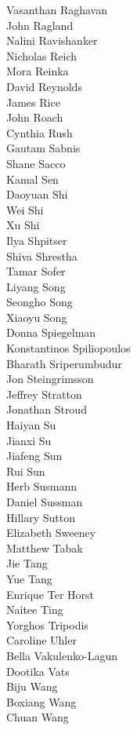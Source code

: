 Vasanthan Raghavan\\
John Ragland\\
Nalini Ravishanker\\
Nicholas Reich\\
Mora Reinka\\
David Reynolds\\
James Rice\\
John Roach\\
Cynthia Rush\\
Gautam Sabnis\\
Shane Sacco\\
Kamal Sen\\
Daoyuan Shi\\
Wei Shi\\
Xu Shi\\
Ilya Shpitser\\
Shiva Shrestha\\
Tamar Sofer\\
Liyang Song\\
Seongho Song\\
Xiaoyu Song\\
Donna Spiegelman\\
Konstantinos Spiliopoulos\\
Bharath Sriperumbudur\\
Jon Steingrimsson\\
Jeffrey Stratton\\
Jonathan Stroud\\
Haiyan Su\\
Jianxi Su\\
Jiafeng Sun\\
Rui Sun\\
Herb Susmann\\
Daniel Sussman\\
Hillary Sutton\\
Elizabeth Sweeney\\
Matthew Tabak\\
Jie Tang\\
Yue Tang\\
Enrique Ter Horst\\
Naitee Ting\\
Yorghos Tripodis\\
Caroline Uhler\\
Bella Vakulenko-Lagun\\
Dootika Vats\\
Biju Wang\\
Boxiang Wang\\
Chuan Wang\\
